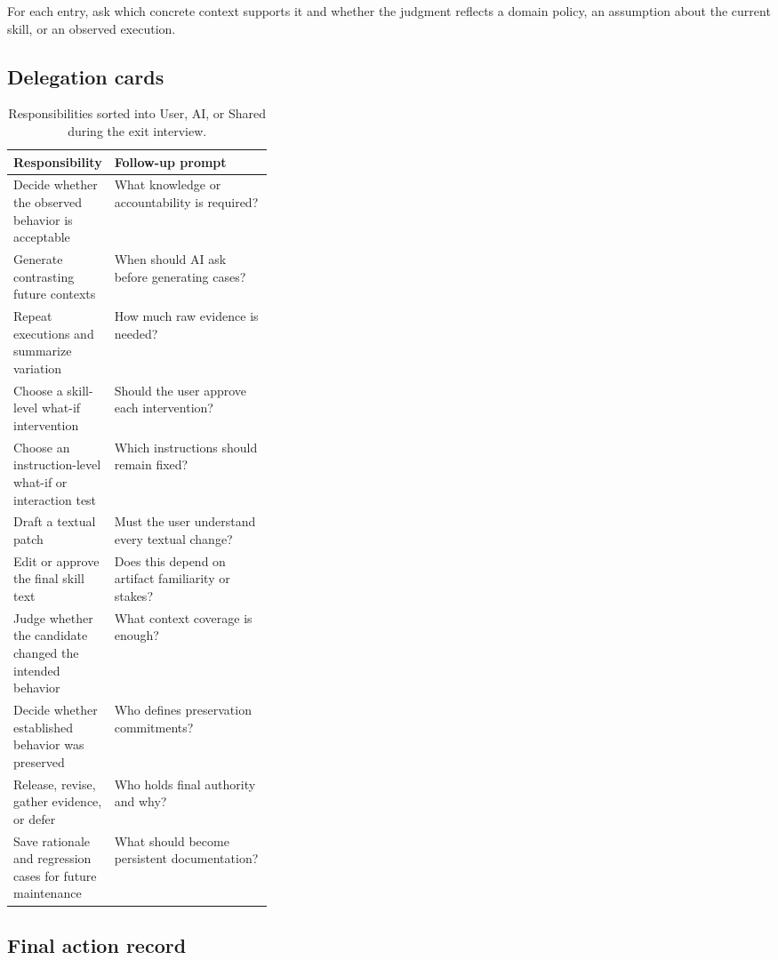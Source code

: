For each entry, ask which concrete context supports it and whether the judgment
reflects a domain policy, an assumption about the current skill, or an observed
execution.

\subsection{Delegation cards}

\begin{table}[h]
\centering
\caption{Responsibilities sorted into User, AI, or Shared during the exit interview.}
\label{tab:delegation-cards}
\begin{tabularx}{\linewidth}{P{0.34\linewidth}Y}
\toprule
\textbf{Responsibility} & \textbf{Follow-up prompt} \\
\midrule
Decide whether the observed behavior is acceptable & What knowledge or accountability is required? \\
Generate contrasting future contexts & When should AI ask before generating cases? \\
Repeat executions and summarize variation & How much raw evidence is needed? \\
Choose a skill-level what-if intervention & Should the user approve each intervention? \\
Choose an instruction-level what-if or interaction test & Which instructions should remain fixed? \\
Draft a textual patch & Must the user understand every textual change? \\
Edit or approve the final skill text & Does this depend on artifact familiarity or stakes? \\
Judge whether the candidate changed the intended behavior & What context coverage is enough? \\
Decide whether established behavior was preserved & Who defines preservation commitments? \\
Release, revise, gather evidence, or defer & Who holds final authority and why? \\
Save rationale and regression cases for future maintenance & What should become persistent documentation? \\
\bottomrule
\end{tabularx}
\end{table}

\subsection{Final action record}

